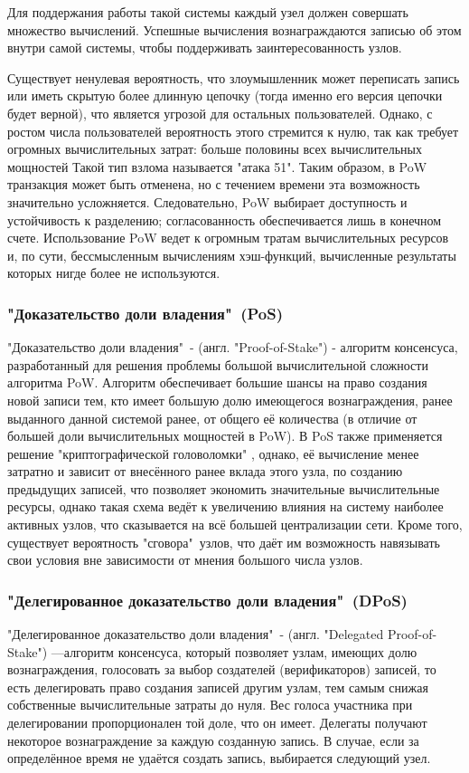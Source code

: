 \documentclass[subf, href, colorlinks=true, 14pt,
times, mtpro, specialist]{disser}
\theoremstyle{definition}
\begin{document}
Для поддержания работы такой системы каждый узел должен совершать множество вычислений. Успешные вычисления вознаграждаются записью об этом внутри самой системы, чтобы поддерживать заинтересованность узлов.

Существует ненулевая вероятность, что злоумышленник может переписать запись или иметь скрытую более длинную цепочку (тогда именно его версия цепочки будет верной), что является угрозой для остальных пользователей. Однако, с ростом числа пользователей вероятность этого стремится к нулю, так как требует огромных вычислительных затрат: больше половины всех вычислительных мощностей Такой тип взлома называется "атака 51"{}. Таким образом, в PoW транзакция может быть отменена, но с течением времени эта возможность значительно усложняется. Следовательно, PoW выбирает доступность и устойчивость к разделению; согласованность обеспечивается лишь в конечном счете. Использование PoW ведет к огромным тратам вычислительных ресурсов и, по сути, бессмысленным вычислениям хэш-функций, вычисленные результаты которых нигде более не используются.

\subsubsection{"Доказательство доли владения"\ (PoS)}

"Доказательство доли владения"\ - (англ. "Proof-of-Stake"{}) -  алгоритм консенсуса, разработанный для решения проблемы большой вычислительной сложности алгоритма PoW. Алгоритм обеспечивает большие шансы на право создания новой записи тем, кто имеет большую долю имеющегося вознаграждения, ранее выданного данной системой ранее, от общего её количества (в отличие от большей доли вычислительных мощностей в PoW). В PoS также применяется решение "криптографической головоломки"{} , однако, её вычисление менее затратно и зависит от внесённого ранее вклада этого узла, по созданию предыдущих записей, что позволяет экономить значительные вычислительные ресурсы, однако такая схема ведёт к увеличению влияния на систему наиболее активных узлов, что сказывается на всё большей централизации сети. Кроме того, существует вероятность "сговора"\ узлов, что даёт им возможность навязывать свои условия вне зависимости от мнения большого числа узлов.

\subsubsection{"Делегированное доказательство доли владения"\ (DPoS)}
"Делегированное доказательство доли владения"\ - (англ. "Delegated Proof-of-Stake"{}) ---алгоритм консенсуса, который позволяет узлам, имеющих долю вознаграждения, голосовать за выбор создателей (верификаторов) записей, то есть делегировать право создания записей другим узлам, тем самым снижая собственные вычислительные затраты до нуля. Вес голоса участника при делегировании пропорционален той доле, что он имеет. Делегаты получают некоторое вознаграждение за каждую созданную запись.  В случае, если за определённое время не удаётся создать запись, выбирается следующий узел.
\end{document}
